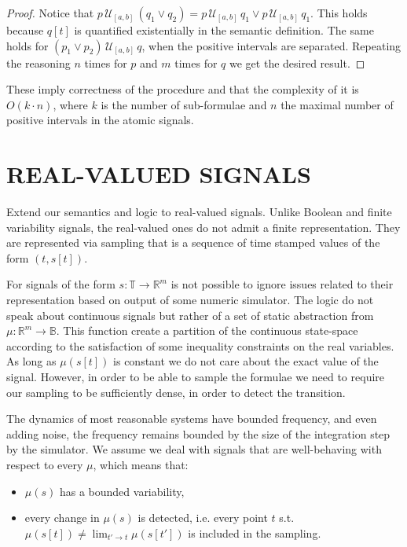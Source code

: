 \documentclass{suftesi}
\begin{document}
\begin{proof}
    Notice that $p\,\mathcal{U}_{[a,b]}\,(q_1\lor q_2)=p\,\mathcal{U}_{[a,b]}\,q_1\lor p\,\mathcal{U}_{[a,b]}\,q_1$. This holds because $q[t]$ is quantified existentially in the semantic definition. The same holds for $(p_1\lor p_2)\,\mathcal{U}_{[a,b]}\,q$, when the positive intervals are separated. Repeating the reasoning $n$ times for $p$ and $m$ times for $q$ we get the desired result.
    
\end{proof}

These imply correctness of the procedure and that the complexity of it is $O(k\cdot n)$, where $k$ is the number of sub-formulae and $n$ the maximal number of positive intervals in the atomic signals.

\section{REAL-VALUED SIGNALS}

Extend our semantics and logic to real-valued signals. Unlike Boolean and finite variability signals, the real-valued ones do not admit a finite representation. They are represented via sampling that is a sequence of time stamped values of the form $(t,s[t])$. 

For signals of the form $s:\mathbb{T}\to\mathbb{R}^m$ is not possible to ignore issues related to their representation based on output of some numeric simulator.
The logic do not speak about continuous signals but rather of a set of static abstraction from $\mu: \mathbb{R}^m\to\mathbb{B}$. This function create a partition of the continuous state-space according to the satisfaction of some inequality constraints on the real variables. As long as $\mu(s[t])$ is constant we do not care about the exact value of the signal. However, in order to be able to sample the formulae we need to require our sampling to be sufficiently dense, in order to detect the transition. 

The dynamics of most reasonable systems have bounded frequency, and even adding noise, the frequency remains bounded by the size of the integration step by the simulator. We assume we deal with signals that are well-behaving with respect to every $\mu$, which means that:
\begin{itemize}[leftmargin=0.5cm]
    \item $\mu(s)$ has a bounded variability,
    \item every change in $\mu(s)$ is detected, i.e. every point $t$ s.t. $\mu(s[t])\neq\lim_{t'\to t}\mu(s[t'])$ is included in the sampling.
\end{itemize}
\end{document}
